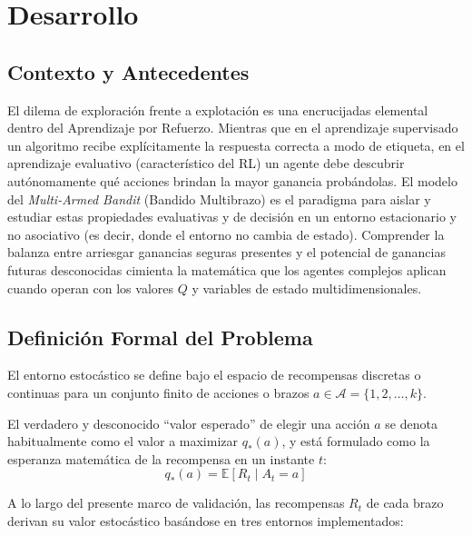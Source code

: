 \section{Desarrollo}\label{desarrollo}

\subsection{Contexto y Antecedentes}\label{contexto-y-antecedentes}

El dilema de exploración frente a explotación es una encrucijadas
elemental dentro del Aprendizaje por Refuerzo. Mientras que en el
aprendizaje supervisado un algoritmo recibe explícitamente la respuesta
correcta a modo de etiqueta, en el aprendizaje evaluativo
(característico del RL) un agente debe descubrir autónomamente qué
acciones brindan la mayor ganancia probándolas. El modelo del
\emph{Multi-Armed Bandit} (Bandido Multibrazo) es el paradigma para
aislar y estudiar estas propiedades evaluativas y de decisión en un
entorno estacionario y no asociativo (es decir, donde el entorno no
cambia de estado). Comprender la balanza entre arriesgar ganancias
seguras presentes y el potencial de ganancias futuras desconocidas
cimienta la matemática que los agentes complejos aplican cuando operan
con los valores \(Q\) y variables de estado multidimensionales.

\subsection{Definición Formal del
Problema}\label{definiciuxf3n-formal-del-problema}

El entorno estocástico se define bajo el espacio de recompensas
discretas o continuas para un conjunto finito de acciones o brazos
\(a \in \mathcal{A} = \{1, 2, \dots, k\}\).

El verdadero y desconocido ``valor esperado'' de elegir una acción \(a\)
se denota habitualmente como el valor a maximizar \(q_*(a)\), y está
formulado como la esperanza matemática de la recompensa en un instante
\(t\): \[ q_*(a) = \mathbb{E}[R_t \mid A_t = a] \]

A lo largo del presente marco de validación, las recompensas \(R_t\) de cada brazo
derivan su valor estocástico basándose en tres entornos implementados:

